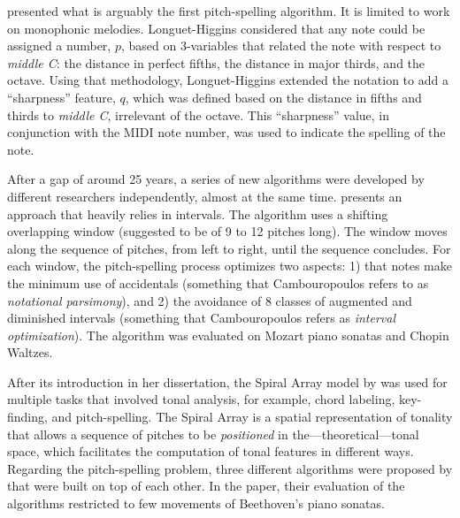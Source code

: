 

\textcite{longuethiggins1976perception} presented what is
arguably the first pitch-spelling algorithm. It is limited
to work on monophonic melodies. Longuet-Higgins considered
that any note could be assigned a number, $p$, based on
3-variables that related the note with respect to
\emph{middle C}: the distance in perfect fifths, the
distance in major thirds, and the octave. Using that
methodology, Longuet-Higgins extended the notation to add a
``sharpness'' feature, $q$, which was defined based on the
distance in fifths and thirds to \emph{middle C}, irrelevant
of the octave. This ``sharpness'' value, in conjunction with
the MIDI note number, was used to indicate the spelling of
the note.

After a gap of around 25 years, a series of new algorithms
were developed by different researchers independently,
almost at the same time. \textcite{cambouropoulos2003pitch}
presents an approach that heavily relies in intervals. The
algorithm uses a shifting overlapping window (suggested to
be of 9 to 12 pitches long). The window moves along the
sequence of pitches, from left to right, until the sequence
concludes. For each window, the pitch-spelling process
optimizes two aspects: 1) that notes make the minimum use of
accidentals (something that Cambouropoulos refers to as
\emph{notational parsimony}), and 2) the avoidance of 8
classes of augmented and diminished intervals (something
that Cambouropoulos refers as \emph{interval optimization}).
The algorithm was evaluated on Mozart piano sonatas and
Chopin Waltzes.

After its introduction in her dissertation, the Spiral Array
model by \textcite{chew2000towards} was used for multiple
tasks that involved tonal analysis, for example, chord
labeling, key-finding, and pitch-spelling. The Spiral Array
is a spatial representation of tonality that allows a
sequence of pitches to be \emph{positioned} in
the---theoretical---tonal space, which facilitates the
computation of tonal features in different ways. Regarding
the pitch-spelling problem, three different algorithms were
proposed by \textcite{chew2003determining} that were built
on top of each other. In the paper, their evaluation of the
algorithms restricted to few movements of Beethoven's piano
sonatas.


